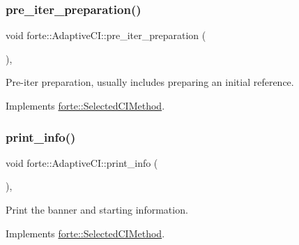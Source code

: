 \mbox{\label{classforte_1_1_adaptive_c_i_afe7882564768985b90d3b3fd21c20a5f}} 
\subsubsection{\texorpdfstring{pre\+\_\+iter\+\_\+preparation()}{pre\_iter\_preparation()}}
{\footnotesize\ttfamily void forte\+::\+Adaptive\+C\+I\+::pre\+\_\+iter\+\_\+preparation (\begin{DoxyParamCaption}{ }\end{DoxyParamCaption})\hspace{0.3cm}{\ttfamily [override]}, {\ttfamily [virtual]}}



Pre-\/iter preparation, usually includes preparing an initial reference. 



Implements \mbox{\hyperlink{classforte_1_1_selected_c_i_method_af92b210415034874fcf2faac8b00eca9}{forte\+::\+Selected\+C\+I\+Method}}.

\mbox{\label{classforte_1_1_adaptive_c_i_a849ad578ee7ab5e78532a77df9b3ce9b}} 
\subsubsection{\texorpdfstring{print\+\_\+info()}{print\_info()}}
{\footnotesize\ttfamily void forte\+::\+Adaptive\+C\+I\+::print\+\_\+info (\begin{DoxyParamCaption}{ }\end{DoxyParamCaption})\hspace{0.3cm}{\ttfamily [override]}, {\ttfamily [virtual]}}



Print the banner and starting information. 



Implements \mbox{\hyperlink{classforte_1_1_selected_c_i_method_a95680d60059b29c763b5f87f9add48e2}{forte\+::\+Selected\+C\+I\+Method}}.


